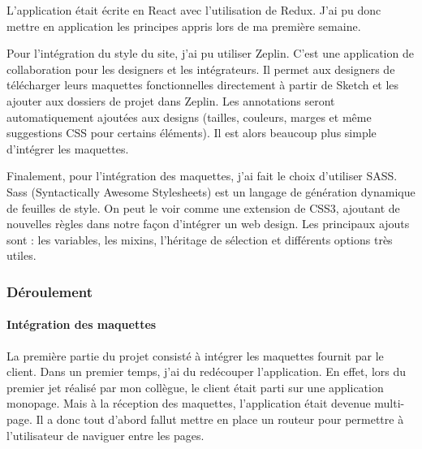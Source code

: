 \documentclass[12pt,a4paper]{article}
\begin{document}
  \bigskip

  L'application était écrite en React avec l'utilisation de Redux. J'ai pu
  donc mettre en application les principes appris lors de ma première
  semaine.

  \bigskip

  Pour l'intégration du style du site, j'ai pu utiliser Zeplin. C'est une
  application de collaboration pour les designers et les intégrateurs. Il
  permet aux designers de télécharger leurs maquettes fonctionnelles
  directement à partir de Sketch et les ajouter aux dossiers de projet
  dans Zeplin. Les annotations seront automatiquement ajoutées aux designs
  (tailles, couleurs, marges et même suggestions CSS pour certains
  éléments). Il est alors beaucoup plus simple d'intégrer les maquettes.

  \bigskip

  Finalement, pour l'intégration des maquettes, j'ai fait le choix
  d'utiliser SASS. Sass (Syntactically Awesome Stylesheets) est un langage
  de génération dynamique de feuilles de style. On peut le voir comme une
  extension de CSS3, ajoutant de nouvelles règles dans notre façon
  d'intégrer un web design. Les principaux ajouts sont : les variables,
  les mixins, l'héritage de sélection et différents options très utiles.

  \bigskip

  \subsubsection{Déroulement}\label{duxe9roulement}

  \bigskip

  \paragraph{Intégration des
  maquettes}\label{intuxe9gration-des-maquettes}

  \bigskip

  La première partie du projet consisté à intégrer les maquettes fournit
  par le client. Dans un premier temps, j'ai du redécouper l'application.
  En effet, lors du premier jet réalisé par mon collègue, le client était
  parti sur une application monopage. Mais à la réception des maquettes,
  l'application était devenue multi-page. Il a donc tout d'abord fallut
  mettre en place un routeur pour permettre à l'utilisateur de naviguer
  entre les pages.

  \bigskip
\end{document}
